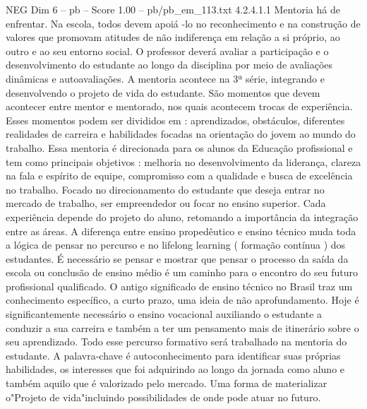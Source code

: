 \begin{textsample}{NEG Dim 6 – pb – Score 1.00 – pb/pb\_em\_113.txt}  \label{ex:f6_neg_089}
4.2.4.1.1 Mentoria há de enfrentar.
Na escola, todos devem apoiá -lo no reconhecimento e na construção de valores que promovam atitudes de não indiferença em relação a si próprio, ao outro e ao seu entorno social.
O professor deverá avaliar a participação e o desenvolvimento do estudante ao longo da disciplina por meio de avaliações dinâmicas e autoavaliações.
A mentoria acontece na 3ª série, integrando e desenvolvendo o projeto de vida do estudante.
São momentos que devem acontecer entre mentor e mentorado, nos quais acontecem trocas de experiência.
Esses momentos podem ser divididos em : aprendizados, obstáculos, diferentes realidades de carreira e habilidades focadas na orientação do jovem ao mundo do trabalho.
Essa mentoria é direcionada para os alunos da Educação profissional e tem como principais objetivos : melhoria no desenvolvimento da liderança, clareza na fala e espírito de equipe, compromisso com a qualidade e busca de excelência no trabalho.
Focado no direcionamento do estudante que deseja entrar no mercado de trabalho, ser empreendedor ou focar no ensino superior.
Cada experiência depende do projeto do aluno, retomando a importância da integração entre as áreas.
A diferença entre ensino propedêutico e ensino técnico muda toda a lógica de pensar no percurso e no lifelong learning ( formação contínua ) dos estudantes.
É necessário se pensar e mostrar que pensar o processo da saída da escola ou conclusão de ensino médio é um caminho para o encontro do seu futuro profissional qualificado.
O antigo significado de ensino técnico no Brasil traz um conhecimento específico, a curto prazo, uma ideia de não aprofundamento.
Hoje é significantemente necessário o ensino vocacional auxiliando o estudante a conduzir a sua carreira e também a ter um pensamento mais de itinerário sobre o seu aprendizado.
Todo esse percurso formativo será trabalhado na mentoria do estudante.
A palavra-chave é autoconhecimento para identificar suas próprias habilidades, os interesses que foi adquirindo ao longo da jornada como aluno e também aquilo que é valorizado pelo mercado.
Uma forma de materializar o"Projeto de vida"incluindo possibilidades de onde pode atuar no futuro.

\end{textsample}
